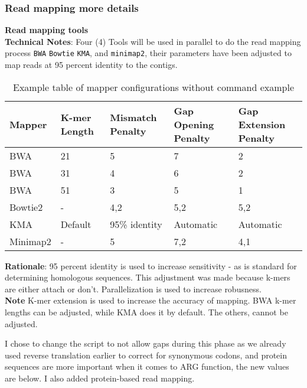 \documentclass[11pt]{article}
\begin{document}
\begin{itemize}
		\subsubsection{Read mapping more details}
	\textbf {Read mapping tools} \\
	\textbf{Technical Notes}: Four (4) Tools will be used in parallel to do the read mapping process \texttt{BWA} \texttt{Bowtie} \texttt{KMA}, and \texttt{minimap2}, their parameters have been adjusted to map reads at 95 percent identity to the contigs.  \\
	
\begin{table}[h!]
	\centering
	\begin{adjustbox}{max width=\linewidth}
		\begin{tabular}{|p{3cm}|p{3cm}|p{3cm}|p{3cm}|p{3cm}|}
			\hline
			\textbf{Mapper} & \textbf{K-mer Length} & \textbf{Mismatch Penalty} & \textbf{Gap Opening Penalty} & \textbf{Gap Extension Penalty} \\ \hline
			BWA & 21 & 5 & 7 & 2 \\ \hline
			BWA & 31 & 4 & 6 & 2 \\ \hline
			BWA & 51 & 3 & 5 & 1 \\ \hline
			Bowtie2 & - & 4,2 & 5,2 & 5,2 \\ \hline
			KMA & Default & 95\% identity & Automatic & Automatic \\ \hline
			Minimap2 & - & 5 & 7,2 & 4,1 \\ \hline
		\end{tabular}
	\end{adjustbox}
	\caption{Example table of mapper configurations without command example}
	\label{tab:mapper_configurations}
\end{table}
	
	\textbf{Rationale}: 95 percent identity is used to increase sensitivity - as is standard for determining homologous sequences. This adjustment was made because k-mers are either attach or don't. Parallelization is used to increase robusness.\\
	\textbf{Note} K-mer extension is used to increase the accuracy of mapping. BWA k-mer lengths can be adjusted, while KMA does it by default. The others, cannot be adjusted. \\
	
	\begin{tcolorbox}[title=Note (\today)]
		I chose to change the script to not allow gaps during this phase as we already used reverse translation earlier to correct for synonymous codons, and protein sequences are more important when it comes to ARG function, the new values are below. I also added protein-based read mapping. 
	\end{tcolorbox}



\end{itemize}
\end{document}
